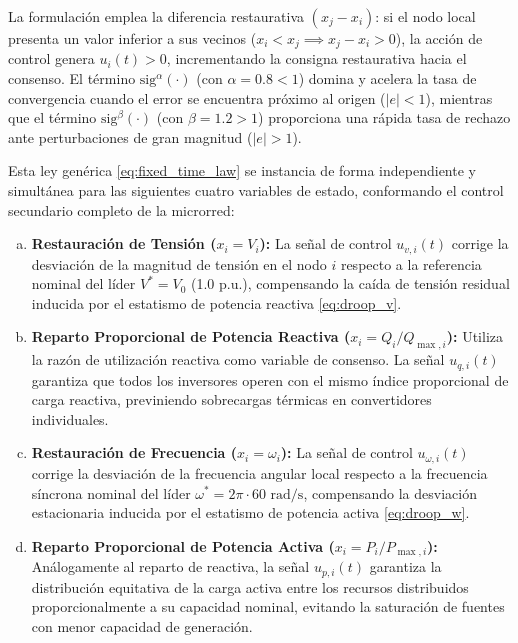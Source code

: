 La formulación emplea la diferencia restaurativa $(x_j - x_i)$: si el nodo local presenta un valor inferior a sus vecinos ($x_i < x_j \implies x_j - x_i > 0$), la acción de control genera $u_i(t) > 0$, incrementando la consigna restaurativa hacia el consenso. El término $\text{sig}^\alpha(\cdot)$ (con $\alpha = 0.8 < 1$) domina y acelera la tasa de convergencia cuando el error se encuentra próximo al origen ($|e| < 1$), mientras que el término $\text{sig}^\beta(\cdot)$ (con $\beta = 1.2 > 1$) proporciona una rápida tasa de rechazo ante perturbaciones de gran magnitud ($|e| > 1$).

Esta ley genérica \eqref{eq:fixed_time_law} se instancia de forma independiente y simultánea para las siguientes cuatro variables de estado, conformando el control secundario completo de la microrred:

\begin{enumerate}[a)]
    \item \textbf{Restauración de Tensión ($x_i = V_i$):} La señal de control $u_{v,i}(t)$ corrige la desviación de la magnitud de tensión en el nodo $i$ respecto a la referencia nominal del líder $V^* = V_0$ (1.0 p.u.), compensando la caída de tensión residual inducida por el estatismo de potencia reactiva \eqref{eq:droop_v}.
    
    \item \textbf{Reparto Proporcional de Potencia Reactiva ($x_i = Q_i / Q_{\max, i}$):} Utiliza la razón de utilización reactiva como variable de consenso. La señal $u_{q,i}(t)$ garantiza que todos los inversores operen con el mismo índice proporcional de carga reactiva, previniendo sobrecargas térmicas en convertidores individuales.
    
    \item \textbf{Restauración de Frecuencia ($x_i = \omega_i$):} La señal de control $u_{\omega,i}(t)$ corrige la desviación de la frecuencia angular local respecto a la frecuencia síncrona nominal del líder $\omega^* = 2\pi \cdot 60\text{ rad/s}$, compensando la desviación estacionaria inducida por el estatismo de potencia activa \eqref{eq:droop_w}.
    
    \item \textbf{Reparto Proporcional de Potencia Activa ($x_i = P_i / P_{\max, i}$):} Análogamente al reparto de reactiva, la señal $u_{p,i}(t)$ garantiza la distribución equitativa de la carga activa entre los recursos distribuidos proporcionalmente a su capacidad nominal, evitando la saturación de fuentes con menor capacidad de generación.
\end{enumerate}

